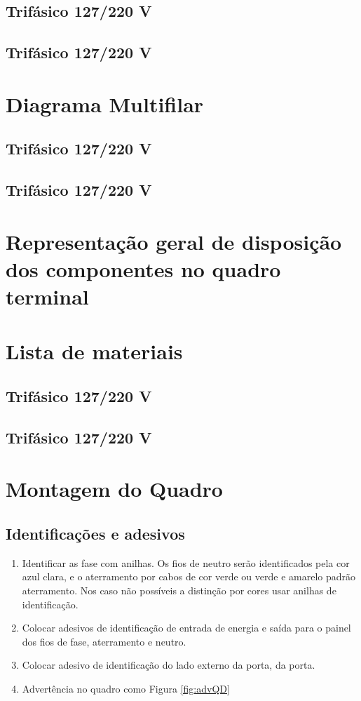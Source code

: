 \subsection{Trifásico 127/220 V}

\subsection{Trifásico 127/220 V}

\section{Diagrama Multifilar}

\subsection{Trifásico 127/220 V}

\subsection{Trifásico 127/220 V}

\section{Representação geral de disposição dos componentes no quadro terminal}

\section{Lista de materiais}

\subsection{Trifásico 127/220 V}

\subsection{Trifásico 127/220 V}

\section{Montagem do Quadro}

\subsection{Identificações e adesivos}
\begin{enumerate}
\item Identificar as fase com anilhas. Os fios de neutro serão identificados pela cor azul clara, e o aterramento por cabos de cor verde ou verde e amarelo padrão aterramento. Nos caso não possíveis a distinção por cores usar anilhas de identificação.
\item Colocar adesivos de identificação de entrada de energia e saída para o painel dos fios de fase, aterramento e neutro.
\item  Colocar adesivo de identificação do lado externo da porta, da porta.
\item Advertência no quadro como Figura \ref{fig:advQD}
\end{enumerate}


